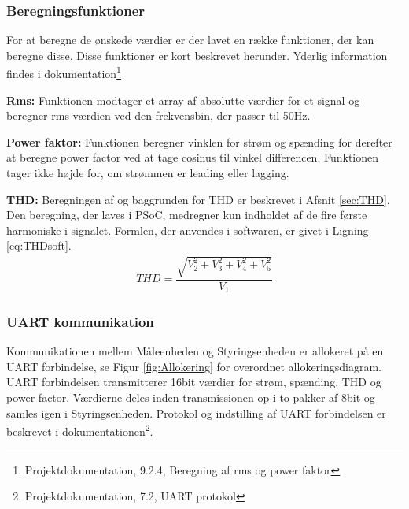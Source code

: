 
\subsubsection{Beregningsfunktioner}
For at beregne de ønskede værdier er der lavet en række funktioner, der kan beregne disse. Disse funktioner er kort beskrevet herunder. Yderlig information findes i dokumentation\footnote{Projektdokumentation, 9.2.4, Beregning af rms og power faktor}

\textbf{Rms:}
Funktionen modtager et array af absolutte værdier for et signal og beregner rms-værdien ved den frekvensbin, der passer til 50Hz.

\textbf{Power faktor:}
Funktionen beregner vinklen for strøm og spænding for derefter at beregne power factor ved at tage cosinus til vinkel differencen. Funktionen tager ikke højde for, om strømmen er leading eller lagging.

\textbf{THD:}
Beregningen af og baggrunden for THD er beskrevet i Afsnit \ref{sec:THD}. Den beregning, der laves i PSoC, medregner kun indholdet af de fire første harmoniske i signalet. Formlen, der anvendes i softwaren, er givet i Ligning \ref{eq:THDsoft}.
\begin{align}
\label{eq:THDsoft}
THD = \dfrac{\sqrt{V_2^{2}+V_3^{2}+V_4^{2}+V_5^{2}}}{V_{1}}
\end{align}
 

\subsubsection{UART kommunikation}
Kommunikationen mellem Måleenheden og Styringsenheden er allokeret på en UART forbindelse, se Figur \ref{fig:Allokering} for overordnet allokeringsdiagram. UART forbindelsen transmitterer 16bit værdier for strøm, spænding, THD og power factor. Værdierne deles inden transmissionen op i to pakker af 8bit og samles igen i Styringsenheden. Protokol og indstilling af UART forbindelsen er beskrevet i dokumentationen\footnote{Projektdokumentation, 7.2, UART protokol}.




